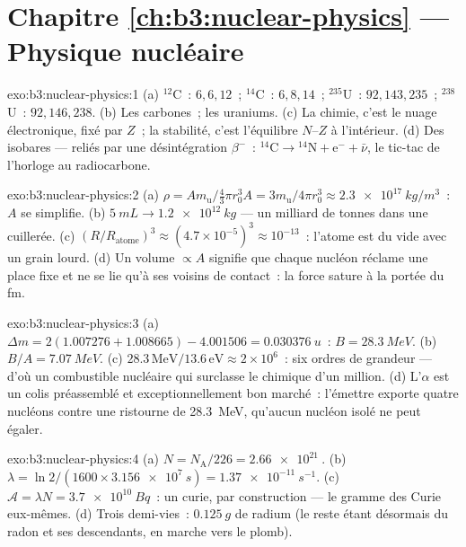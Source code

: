 \section*{Chapitre \ref{ch:b3:nuclear-physics} --- Physique nucléaire}

\begin{solution}{exo:b3:nuclear-physics:1}
(a) $^{12}$C~: $6, 6, 12$~; $^{14}$C~: $6, 8, 14$~; $^{235}$U~:
$92, 143, 235$~; $^{238}$U~: $92, 146, 238$. (b) Les carbones~; les
uraniums. (c) La chimie, c'est le nuage électronique, fixé par $Z$~;
la stabilité, c'est l'équilibre $N$--$Z$ à l'intérieur. (d) Des
isobares --- reliés par une désintégration $\beta^-$~: $^{14}\text{C} \to {}^{14}\text{N}
+ \text{e}^- + \bar\nu$, le tic-tac de l'horloge au radiocarbone.
\end{solution}

\begin{solution}{exo:b3:nuclear-physics:2}
(a) $\rho = Am_{\text{u}}/\tfrac43\pi r_0^3A =
3m_{\text{u}}/4\pi r_0^3 \approx \qty{2.3e17}{kg/m^3}$~: $A$ se
simplifie. (b) $\qty{5}{mL} \to \qty{1.2e12}{kg}$ --- un milliard de
tonnes dans une cuillerée. (c) $(R/R_{\text{atome}})^3 \approx
(4.7\times10^{-5})^3 \approx 10^{-13}$~: l'atome est du vide avec un
grain lourd. (d) Un volume $\propto A$ signifie que chaque nucléon
réclame une place fixe et ne se lie qu'à ses voisins de contact~: la
force sature à la portée du \unit{fm}.
\end{solution}

\begin{solution}{exo:b3:nuclear-physics:3}
(a) $\Delta m = 2(1.007276 + 1.008665) - 4.001506 =
\qty{0.030376}{u}$~: $B = \qty{28.3}{MeV}$. (b) $B/A =
\qty{7.07}{MeV}$. (c) $28.3\,\text{MeV}/13.6\,\text{eV} \approx
2\times10^6$~: six ordres de grandeur --- d'où un combustible
nucléaire qui surclasse le chimique d'un million. (d) L'$\alpha$ est
un colis préassemblé et exceptionnellement bon marché~: l'émettre
exporte quatre nucléons contre une ristourne de \qty{28.3}{MeV},
qu'aucun nucléon isolé ne peut égaler.
\end{solution}

\begin{solution}{exo:b3:nuclear-physics:4}
(a) $N = N_{\text{A}}/226 = \qty{2.66e21}{}$. (b) $\lambda =
\ln2/(1600\times\qty{3.156e7}{s}) = \qty{1.37e-11}{s^{-1}}$. (c)
$\mathcal A = \lambda N = \qty{3.7e10}{Bq}$~: un curie, par
construction --- le gramme des Curie eux-mêmes. (d) Trois demi-vies~:
$\qty{0.125}{g}$ de radium (le reste étant désormais du radon et ses
descendants, en marche vers le plomb).
\end{solution}

